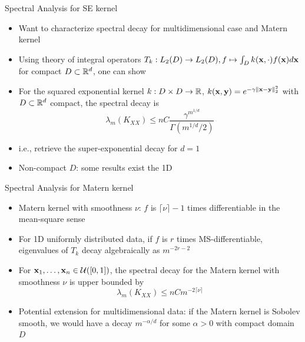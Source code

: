 \documentclass{beamer}
\begin{document}
\begin{frame}{Spectral Analysis for SE kernel}
\begin{itemize}[<+->]
    \item Want to characterize spectral decay for multidimensional case and Matern kernel
    \item Using theory of integral operators $T_k: L_2(D) \to L_2(D), f \mapsto \int_D k(\boldsymbol{\mathbf{x}}, \cdot) f(\boldsymbol{\mathbf{x}}) d\boldsymbol{\mathbf{x}}$ for compact $D \subset \mathbb R^d$, one can show
    \item \begin{minipage}[t]{\linewidth}
        \vspace*{-1.2\baselineskip}
        \begin{theorem}
        For the squared exponential kernel $k: D \times D \to \mathbb R$, $k(\boldsymbol{\mathbf{x}}, \boldsymbol{\mathbf{y}}) = e^{-\gamma \Vert \boldsymbol{\mathbf{x}} - \boldsymbol{\mathbf{y}} \Vert_2^2}$ with $ D \subset \mathbb R^d$ compact, the spectral decay is
        \begin{equation*}
            \lambda_m(K_{XX}) \le n C \frac{ \gamma^{m^{1/d}} }{\Gamma(m^{1/d}/2)}
        \end{equation*}
        \end{theorem}
    \end{minipage}
    \item i.e., retrieve the super-exponential decay for $d=1$
    
    \item Non-compact $D$: some results exist the 1D
\end{itemize}
\end{frame}

\begin{frame}{Spectral Analysis for Matern kernel}
\begin{itemize}[<+->]
    \item Matern kernel with smoothness $\nu$: $f$ is $\lceil \nu \rceil - 1$ times differentiable in the mean-square sense
    \item For 1D uniformly distributed data, if $f$ is $r$ times MS-differentiable, eigenvalues of $T_k$ decay algebraically as $m^{-2r - 2}$
    \item     \begin{minipage}[t]{\linewidth}
        \vspace*{-1.2\baselineskip}
        \begin{theorem}
        For $\boldsymbol{\mathbf{x}}_1, \ldots, \boldsymbol{\mathbf{x}}_n \in \mathcal U([0, 1])$, the spectral decay for the Matern kernel with smoothness $\nu$ is upper bounded by 
        \begin{equation*}
            \lambda_m(K_{XX}) \le n C m^{-2\lceil \nu \rceil }
        \end{equation*}
        \end{theorem}
    \end{minipage}
    \item Potential extension for multidimensional data: if the Matern kernel is Sobolev smooth, we would have a decay $m^{-\alpha/d}$ for some $\alpha > 0$ with compact domain $D$
\end{itemize}
\end{frame}
\end{document}
